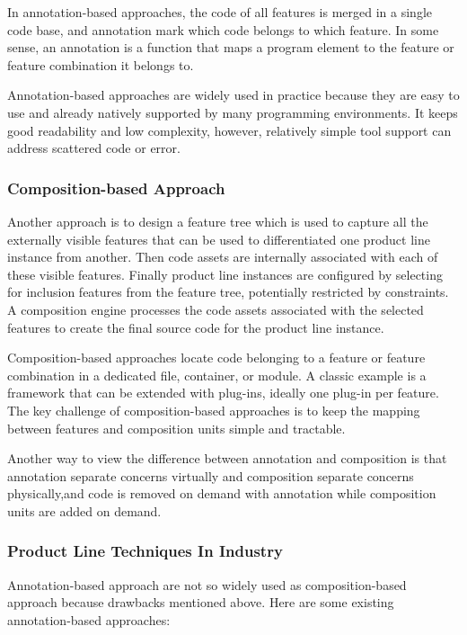 In annotation-based approaches, the code of all features is merged in a single code base, and annotation mark which code
 belongs to which feature. In some sense, an annotation is a function that maps a program element to the feature or
 feature combination it belongs to.

Annotation-based approaches are widely used in practice because they are easy to use and already natively supported
by many programming environments. It keeps good readability and low complexity, however, relatively simple tool support
can address scattered code or error.




\subsubsection{Composition-based Approach}

Another approach is to design a feature tree which is used to capture all the externally visible features that
can be used to differentiated one product line instance from another. Then code assets are internally associated
 with each of these visible features. Finally product line instances are configured by selecting for inclusion
  features from the feature tree, potentially restricted by constraints. A composition engine processes the
  code assets associated with the selected features to create the final source code for the product line instance.

Composition-based approaches locate code belonging to a feature or feature combination in a dedicated file,
container, or module. A classic example is a framework that can be extended with plug-ins, ideally one plug-in
per feature. The key challenge of composition-based approaches is to keep the mapping between features and
composition units simple and tractable.

Another way to view the difference between annotation and composition is that annotation separate concerns
virtually and composition separate concerns physically,and code is removed on demand with annotation while
composition units are added on demand.


\subsubsection{Product Line Techniques In Industry}

Annotation-based approach are not so widely used as composition-based approach because drawbacks mentioned above.
Here are some existing annotation-based approaches:

